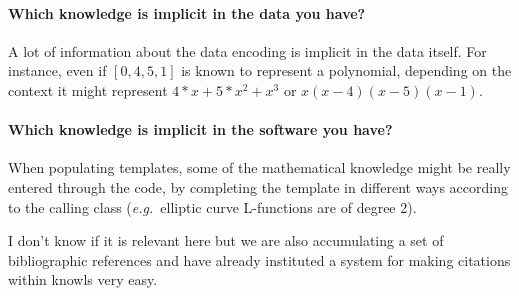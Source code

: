 \paragraph{Which knowledge is implicit in the data you have?}
A lot of information about the data encoding is implicit in the data itself. For instance, even if $[0,4,5,1]$ is known to represent a polynomial, depending on the context it might represent $4*x+5*x^2+x^3$ or $x(x-4)(x-5)(x-1)$.

\paragraph{ Which knowledge is implicit in the software you have?}

When populating templates, some of the mathematical knowledge might be really entered through the code, by completing the template in different ways according to the calling class (\emph{e.g.}~elliptic curve L-functions are of degree 2).

I don't know if it is relevant here but we are also accumulating a set of
bibliographic references and have already instituted a system for making
citations within knowls very easy.


